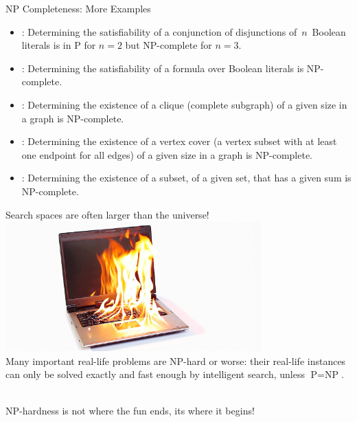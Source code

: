 \documentclass{cons-beamer}
\begin{document}
\begin{frame}{NP Completeness: More Examples}
  \begin{examples}
    \begin{itemize}
      \item {}: Determining the satisfiability of a
        conjunction of disjunctions of~$n$~Boolean literals is in P for
        $n=2$  but NP-complete for $n=3$. 
      \item {}: Determining the satisfiability of a formula
        over Boolean literals is NP-complete. 
      \item {}: Determining the existence of a clique
        (complete subgraph) of a given size in a graph is NP-complete.
        
      \item {}: Determining the existence of a
        vertex cover (a vertex subset with at least one endpoint for all
        edges) of a given size in a graph is NP-complete. 
      \item {}: Determining the existence of a subset,
        of a given set, that has a given sum is NP-complete.
    \end{itemize}
  \end{examples}
\end{frame}

\begin{frame}
  Search spaces are often larger than the universe! \vfill
  \includegraphics[height=50mm]{images/burningLaptop} \\
  Many important real-life problems are NP-hard or worse: their
  real-life instances can only be solved exactly and fast enough by
  \alert{intelligent} search, unless $\text{P} =
  \text{NP}$. 
  
  $ $ \\
  \alert{NP-hardness is not where the fun ends, its where it begins!}
\end{frame}
\end{document}
